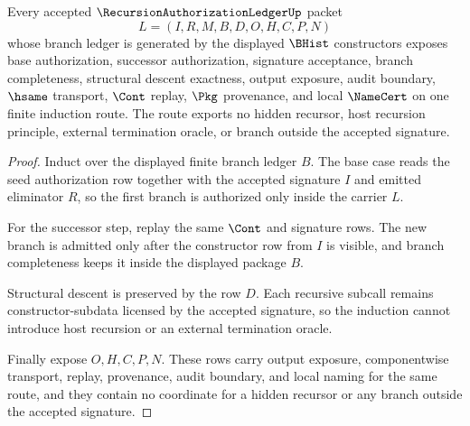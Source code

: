 \begin{theorem}
\label{thm:recursion-authorization-ledger-finite-induction-scope}
Every accepted $\RecursionAuthorizationLedgerUp$ packet
$$
L=(I,R,M,B,D,O,H,C,P,N)
$$
whose branch ledger is generated by the displayed $\BHist$ constructors exposes base authorization, successor authorization, signature acceptance, branch completeness, structural descent exactness, output exposure, audit boundary, $\hsame$ transport, $\Cont$ replay, $\Pkg$ provenance, and local $\NameCert$ on one finite induction route. The route exports no hidden recursor, host recursion principle, external termination oracle, or branch outside the accepted signature.
\end{theorem}
\begin{proof}
Induct over the displayed finite branch ledger $B$. The base case reads the seed authorization row together with the accepted signature $I$ and emitted eliminator $R$, so the first branch is authorized only inside the carrier $L$.

For the successor step, replay the same $\Cont$ and signature rows. The new branch is admitted only after the constructor row from $I$ is visible, and branch completeness keeps it inside the displayed package $B$.

Structural descent is preserved by the row $D$. Each recursive subcall remains constructor-subdata licensed by the accepted signature, so the induction cannot introduce host recursion or an external termination oracle.

Finally expose $O,H,C,P,N$. These rows carry output exposure, componentwise transport, replay, provenance, audit boundary, and local naming for the same route, and they contain no coordinate for a hidden recursor or any branch outside the accepted signature.
\end{proof}


